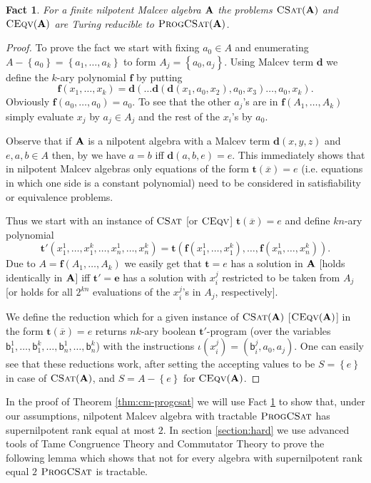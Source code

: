 \documentclass[11pt,a4paper]{amsart}
\newtheorem{fact}[lm]{Fact}
\newcommand{\m}[1]{{\uppercase {\bf{#1}}}}
\newcommand{\set}[1]{{\left\{ {#1} \right\} }}
\newcommand{\po}[1]{{\mathbf {#1}}}
\renewcommand{\o}[1]{\overline {#1}}
\newcommand{\gProblem}[2]{\ensuremath{\operatorname{\textup{\textsc{{#2}}}}
		\ifthenelse{\equal{#1}{}}{}{\!\left( {#1} \right)}}}
\newcommand{\ceqv}[1]{\gProblem{#1}{CEqv}}
\newcommand{\csat}[1]{\gProblem{#1}{CSat}}
\newcommand{\progcsat}[1]{\gProblem{#1}{ProgCSat}}
\newcommand{\setm}{-}
\renewcommand{\b}{\textsf{b}}
\newcommand{\zero}{e}
\begin{document}
\begin{fact}
\label{fact:red-to-progcsat}
For a finite nilpotent Malcev algebra $\m A$ the problems $\csat{\m A}$ and $\ceqv{\m A}$
are Turing reducible to $\progcsat{\m A}$.
\end{fact}

\begin{proof}
To prove the fact we start with fixing $a_0\in A$
and enumerating $A\setm\set{a_0}=\set{a_1,\ldots,a_k}$ to form $A_j=\set{a_0,a_j}$.
Using Malcev term $\po d$ we define the $k$-ary polynomial $\po f$ by putting
\[
\po f(x_1,\ldots,x_k)=\po d(\ldots\po d(\po d(x_1,a_0,x_2),a_0,x_3)\ldots,a_0,x_k).
\]
Obviously $\po f(a_0,\ldots,a_0)=a_0$.
To see that the other $a_j$'s are in $\po f(A_1,\ldots,A_k)$
simply evaluate $x_j$ by $a_j\in A_j$ and the rest of the $x_i$'s by $a_0$.


Observe that if $\m A$ is a nilpotent algebra with a Malcev term $\po d(x,y,z)$
and $\zero,a,b\in A$ then, by \cite[Lemma 7.3]{fm} we have
$a=b$ iff $\po d(a,b,\zero)=\zero$.
This immediately shows that in nilpotent Malcev algebras only equations of the form
$\po t(\o x)=\zero$ (i.e. equations in which one side is a constant polynomial)
need to be considered in satisfiability or equivalence problems.


Thus we start with an instance of \csat{} [or \ceqv{}] $\po t(\o x)=\zero$ and define $kn$-ary polynomial
\[
\po t'(x_1^1,\ldots,x_1^k,\dots, x_n^1,\ldots,x_n^k)
=\po t(\po f(x_1^1,\ldots,x_1^k),\ldots,\po f(x_n^1,\ldots,x_n^k)).
\]
Due to $A = \po f(A_1,\ldots,A_k)$ we easily get that $\po t=e$
has a solution in $\m A$ [holds identically in $\m A$] iff
$\po t'=\po e$
has a solution with $x_i^j$ restricted to be taken from $A_j$
[or holds for all $2^{kn}$ evaluations of the $x_i^j$'s in $A_j$, respectively].

We define the reduction which for a given instance of \csat{\m A} [$\ceqv{\m A}$] in the form $\po t(\o x)=e$ returns  $nk$-ary boolean $\po t'$-program
(over the variables $\b_1^1,\ldots,\b_1^k,\ldots,\b_n^1,\ldots,\b_n^k$) with the instructions
$\iota(x_i^j)=(\b_i^j,a_0,a_j)$. One can easily see that these reductions work, after setting the accepting values
to be $S=\set{\zero}$ in case of $\csat{\m A}$,
and $S=A\setm\set{\zero}$ for $\ceqv{\m A}$.
\end{proof}
In the proof of Theorem \ref{thm:cm-progcsat} we will use Fact \ref{fact:red-to-progcsat} to show that, under our assumptions, nilpotent Malcev algebra with tractable \progcsat{} has supernilpotent rank equal at most $2$. In section \ref{section:hard} we use advanced tools of Tame Congruence Theory and Commutator Theory to prove the following lemma which shows that not for every algebra with supernilpotent rank equal $2$ \progcsat{} is tractable.
\end{document}
